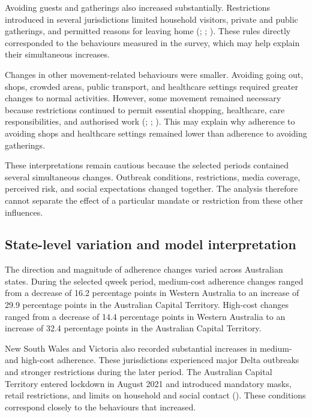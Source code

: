 \documentclass[
  12pt,
  a4paper,
]{article}
\begin{document}
Avoiding guests and gatherings also increased substantially.
Restrictions introduced in several jurisdictions limited household
visitors, private and public gatherings, and permitted reasons for
leaving home (; ; ). These rules directly corresponded to
the behaviours measured in the survey, which may help explain their
simultaneous increases.

Changes in other movement-related behaviours were smaller. Avoiding
going out, shops, crowded areas, public transport, and healthcare
settings required greater changes to normal activities. However, some
movement remained necessary because restrictions continued to permit
essential shopping, healthcare, care responsibilities, and authorised
work (; ; ). This may explain why adherence to avoiding
shops and healthcare settings remained lower than adherence to avoiding
gatherings.

These interpretations remain cautious because the selected periods
contained several simultaneous changes. Outbreak conditions,
restrictions, media coverage, perceived risk, and social expectations
changed together. The analysis therefore cannot separate the effect of a
particular mandate or restriction from these other influences.

\subsection{State-level variation and model interpretation}\label{state-level-variation-and-model-interpretation}

The direction and magnitude of adherence changes varied across
Australian states. During the selected qweek period, medium-cost
adherence changes ranged from a decrease of 16.2 percentage points in
Western Australia to an increase of 29.9 percentage points in the
Australian Capital Territory. High-cost changes ranged from a decrease
of 14.4 percentage points in Western Australia to an increase of 32.4
percentage points in the Australian Capital Territory.

New South Wales and Victoria also recorded substantial increases in
medium- and high-cost adherence. These jurisdictions experienced major
Delta outbreaks and stronger restrictions during the later period. The
Australian Capital Territory entered lockdown in August 2021 and
introduced mandatory masks, retail restrictions, and limits on household
and social contact (). These conditions
correspond closely to the behaviours that increased.
\end{document}
